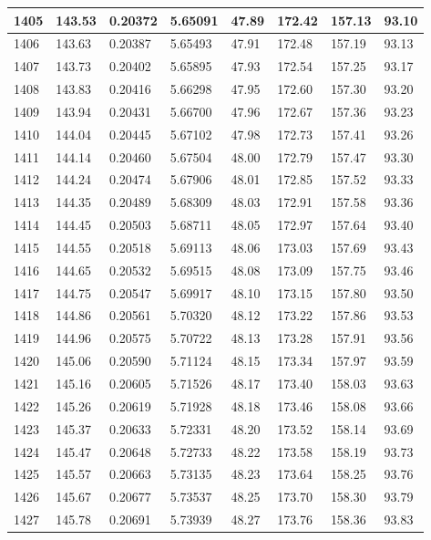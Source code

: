 \documentclass[12pt,a4paper,twoside]{article}
\begin{document}
\begin{center}
\begin{longtable}{l l l l | l l l l}
1405 & 143.53 & 0.20372 & 5.65091 & 47.89 & 172.42 & 157.13 & 93.10 \\ \hline
1406 & 143.63 & 0.20387 & 5.65493 & 47.91 & 172.48 & 157.19 & 93.13 \\ \hline
1407 & 143.73 & 0.20402 & 5.65895 & 47.93 & 172.54 & 157.25 & 93.17 \\ \hline
1408 & 143.83 & 0.20416 & 5.66298 & 47.95 & 172.60 & 157.30 & 93.20 \\ \hline
1409 & 143.94 & 0.20431 & 5.66700 & 47.96 & 172.67 & 157.36 & 93.23 \\ \hline
1410 & 144.04 & 0.20445 & 5.67102 & 47.98 & 172.73 & 157.41 & 93.26 \\ \hline
1411 & 144.14 & 0.20460 & 5.67504 & 48.00 & 172.79 & 157.47 & 93.30 \\ \hline
1412 & 144.24 & 0.20474 & 5.67906 & 48.01 & 172.85 & 157.52 & 93.33 \\ \hline
1413 & 144.35 & 0.20489 & 5.68309 & 48.03 & 172.91 & 157.58 & 93.36 \\ \hline
1414 & 144.45 & 0.20503 & 5.68711 & 48.05 & 172.97 & 157.64 & 93.40 \\ \hline
1415 & 144.55 & 0.20518 & 5.69113 & 48.06 & 173.03 & 157.69 & 93.43 \\ \hline
1416 & 144.65 & 0.20532 & 5.69515 & 48.08 & 173.09 & 157.75 & 93.46 \\ \hline
1417 & 144.75 & 0.20547 & 5.69917 & 48.10 & 173.15 & 157.80 & 93.50 \\ \hline
1418 & 144.86 & 0.20561 & 5.70320 & 48.12 & 173.22 & 157.86 & 93.53 \\ \hline
1419 & 144.96 & 0.20575 & 5.70722 & 48.13 & 173.28 & 157.91 & 93.56 \\ \hline
1420 & 145.06 & 0.20590 & 5.71124 & 48.15 & 173.34 & 157.97 & 93.59 \\ \hline
1421 & 145.16 & 0.20605 & 5.71526 & 48.17 & 173.40 & 158.03 & 93.63 \\ \hline
1422 & 145.26 & 0.20619 & 5.71928 & 48.18 & 173.46 & 158.08 & 93.66 \\ \hline
1423 & 145.37 & 0.20633 & 5.72331 & 48.20 & 173.52 & 158.14 & 93.69 \\ \hline
1424 & 145.47 & 0.20648 & 5.72733 & 48.22 & 173.58 & 158.19 & 93.73 \\ \hline
1425 & 145.57 & 0.20663 & 5.73135 & 48.23 & 173.64 & 158.25 & 93.76 \\ \hline
1426 & 145.67 & 0.20677 & 5.73537 & 48.25 & 173.70 & 158.30 & 93.79 \\ \hline
1427 & 145.78 & 0.20691 & 5.73939 & 48.27 & 173.76 & 158.36 & 93.83 \\ \hline

\end{longtable}
\end{center}
\end{document}
